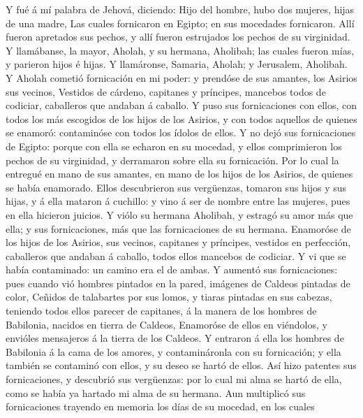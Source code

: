  Y fué á mí palabra de Jehová, diciendo:  Hijo
del hombre, hubo dos mujeres, hijas de una madre,  Las
cuales fornicaron en Egipto; en sus mocedades fornicaron. Allí fueron
apretados sus pechos, y allí fueron estrujados los pechos de su
virginidad.  Y llamábanse, la mayor, Aholah, y su hermana,
Aholibah; las cuales fueron mías, y parieron hijos é hijas. Y
llamáronse, Samaria, Aholah; y Jerusalem, Aholibah.  Y
Aholah cometió fornicación en mi poder: y prendóse de sus amantes, los
Asirios sus vecinos,  Vestidos de cárdeno, capitanes y
príncipes, mancebos todos de codiciar, caballeros que andaban á caballo.
 Y puso sus fornicaciones con ellos, con todos los más
escogidos de los hijos de los Asirios, y con todos aquellos de quienes
se enamoró: contaminóse con todos los ídolos de ellos.  Y no
dejó sus fornicaciones de Egipto: porque con ella se echaron en su
mocedad, y ellos comprimieron los pechos de su virginidad, y derramaron
sobre ella su fornicación.  Por lo cual la entregué en mano
de sus amantes, en mano de los hijos de los Asirios, de quienes se había
enamorado.  Ellos descubrieron sus vergüenzas, tomaron sus
hijos y sus hijas, y á ella mataron á cuchillo: y vino á ser de nombre
entre las mujeres, pues en ella hicieron juicios.  Y viólo
su hermana Aholibah, y estragó su amor más que ella; y sus
fornicaciones, más que las fornicaciones de su hermana. 
Enamoróse de los hijos de los Asirios, sus vecinos, capitanes y
príncipes, vestidos en perfección, caballeros que andaban á caballo,
todos ellos mancebos de codiciar.  Y vi que se había
contaminado: un camino era el de ambas.  Y aumentó sus
fornicaciones: pues cuando vió hombres pintados en la pared, imágenes de
Caldeos pintadas de color,  Ceñidos de talabartes por sus
lomos, y tiaras pintadas en sus cabezas, teniendo todos ellos parecer de
capitanes, á la manera de los hombres de Babilonia, nacidos en tierra de
Caldeos,  Enamoróse de ellos en viéndolos, y envióles
mensajeros á la tierra de los Caldeos.  Y entraron á ella
los hombres de Babilonia á la cama de los amores, y contamináronla con
su fornicación; y ella también se contaminó con ellos, y su deseo se
hartó de ellos.  Así hizo patentes sus fornicaciones, y
descubrió sus vergüenzas: por lo cual mi alma se hartó de ella, como se
había ya hartado mi alma de su hermana.  Aun multiplicó sus
fornicaciones trayendo en memoria los días de su mocedad, en los cuales
